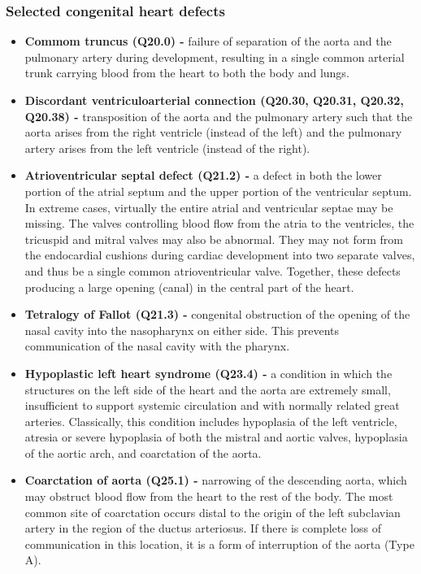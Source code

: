 \documentclass[
]{krantz}
\begin{document}
\hypertarget{section-2114}{%
\subsubsection{Selected congenital heart defects}\label{section-2114}}

\begin{itemize}
\item
  \textbf{Commom truncus (Q20.0) -} failure of separation of the aorta and the pulmonary artery during development, resulting in a single common arterial trunk carrying blood from the heart to both the body and lungs.
\item
  \textbf{Discordant ventriculoarterial connection (Q20.30, Q20.31, Q20.32, Q20.38) -} transposition of the aorta and the pulmonary artery such that the aorta arises from the right ventricle (instead of the left) and the pulmonary artery arises from the left ventricle (instead of the right).
\item
  \textbf{Atrioventricular septal defect (Q21.2) -} a defect in both the lower portion of the atrial septum and the upper portion of the ventricular septum. In extreme cases, virtually the entire atrial and ventricular septae may be missing. The valves controlling blood flow from the atria to the ventricles, the tricuspid and mitral valves may also be abnormal. They may not form from the endocardial cushions during cardiac development into two separate valves, and thus be a single common atrioventricular valve. Together, these defects producing a large opening (canal) in the central part of the heart.
\item
  \textbf{Tetralogy of Fallot (Q21.3) -} congenital obstruction of the opening of the nasal cavity into the nasopharynx on either side. This prevents communication of the nasal cavity with the pharynx.
\item
  \textbf{Hypoplastic left heart syndrome (Q23.4) -} a condition in which the structures on the left side of the heart and the aorta are extremely small, insufficient to support systemic circulation and with normally related great arteries. Classically, this condition includes hypoplasia of the left ventricle, atresia or severe hypoplasia of both the mistral and aortic valves, hypoplasia of the aortic arch, and coarctation of the aorta.
\item
  \textbf{Coarctation of aorta (Q25.1) -} narrowing of the descending aorta, which may obstruct blood flow from the heart to the rest of the body. The most common site of coarctation occurs distal to the origin of the left subclavian artery in the region of the ductus arteriosus. If there is complete loss of communication in this location, it is a form of interruption of the aorta (Type A).
\end{itemize}
\end{document}
